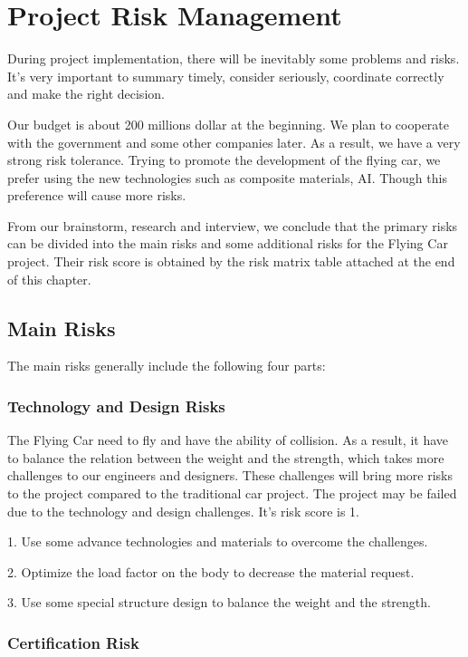 \chapter{Project Risk Management}

During project implementation, there will be inevitably some problems and risks. It's very important to summary timely, consider seriously, coordinate correctly and make the right decision.

Our budget is about 200 millions dollar at the beginning. We plan to cooperate with the government and some other companies later. As a result, we have a very strong risk tolerance. Trying to promote the development of the flying car, we prefer using the new technologies such as composite materials, AI. Though this preference will cause more risks.

From our brainstorm, research and interview, we conclude that the primary risks can be divided into the main risks and some additional risks for the Flying Car project. Their risk score is obtained by the risk matrix table attached at the end of this chapter.

\section{Main Risks}

The main risks generally include the following four parts:

\subsection{Technology and Design Risks}

The Flying Car need to fly and have the ability of collision. As a result, it have to balance the relation between the weight and the strength, which takes more challenges to our engineers and designers. These challenges will bring more risks to the project compared to the traditional car project. The project may be failed due to the technology and design challenges. It’s risk score is 1.

1. Use some advance technologies and materials to overcome the challenges.

2. Optimize the load factor on the body to decrease the material request. 

3. Use some special structure design to balance the weight and the strength.

\subsection{Certification Risk}

